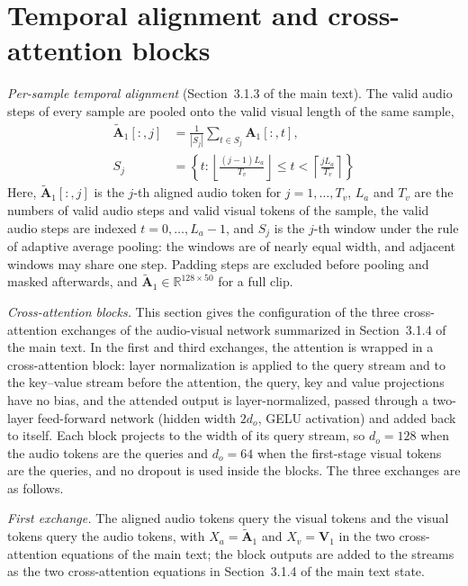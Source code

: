 \documentclass[pdflatex,sn-basic]{sn-jnl}
\begin{document}
\section{Temporal alignment and cross-attention blocks}\label{sec:s_xattn}

\emph{Per-sample temporal alignment} (Section~3.1.3 of the main text). The valid audio steps of every sample are pooled onto the valid visual length of the same sample,
\begin{equation}
\begin{split}
\tilde{\mathbf{A}}_1[:, j] &= \frac{1}{|S_j|}\sum_{t \in S_j} \mathbf{A}_1[:, t],\\
S_j &= \left\{ t : \left\lfloor \tfrac{(j-1)L_a}{T_v} \right\rfloor \le t < \left\lceil \tfrac{j L_a}{T_v} \right\rceil \right\}
\end{split}
\end{equation}
Here, $\tilde{\mathbf{A}}_1[:, j]$ is the $j$-th aligned audio token for $j = 1, \dots, T_v$, $L_a$ and $T_v$ are the numbers of valid audio steps and valid visual tokens of the sample, the valid audio steps are indexed $t = 0, \dots, L_a - 1$, and $S_j$ is the $j$-th window under the rule of adaptive average pooling: the windows are of nearly equal width, and adjacent windows may share one step. Padding steps are excluded before pooling and masked afterwards, and $\tilde{\mathbf{A}}_1 \in \mathbb{R}^{128 \times 50}$ for a full clip.

\emph{Cross-attention blocks.} This section gives the configuration of the three cross-attention exchanges of the audio-visual network summarized in Section~3.1.4 of the main text. In the first and third exchanges, the attention is wrapped in a cross-attention block: layer normalization is applied to the query stream and to the key--value stream before the attention, the query, key and value projections have no bias, and the attended output is layer-normalized, passed through a two-layer feed-forward network (hidden width $2d_o$, GELU activation) and added back to itself. Each block projects to the width of its query stream, so $d_o = 128$ when the audio tokens are the queries and $d_o = 64$ when the first-stage visual tokens are the queries, and no dropout is used inside the blocks. The three exchanges are as follows.

\emph{First exchange.} The aligned audio tokens query the visual tokens and the visual tokens query the audio tokens, with $X_a = \tilde{\mathbf{A}}_1$ and $X_v = \mathbf{V}_1$ in the two cross-attention equations of the main text; the block outputs are added to the streams as the two cross-attention equations in Section~3.1.4 of the main text state.
\end{document}
